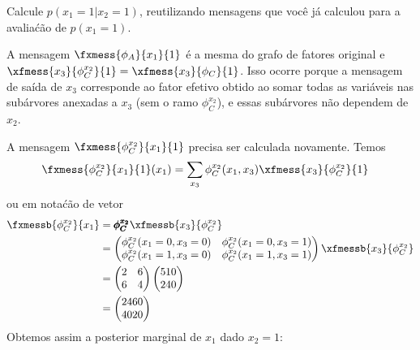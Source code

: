 \begin{exenumerate}
\begin{solution}
    \end{solution}
    
    \item Calcule $p(x_1 =1 | x_2 = 1)$, reutilizando mensagens que voc\^e j\'a calculou para a avalia\'c\~ao de $p(x_1 =1)$.
    
    \begin{solution}
        A mensagem $\fxmess{\phi_A}{x_1}{1}$ \'e a mesma do grafo de fatores
        original e $\xfmess{x_3}{\phi_C^{x_2}}{1} = \xfmess{x_3}{\phi_C}{1}$. Isso
        ocorre porque a mensagem de sa\'ida de $x_3$ corresponde ao fator
        efetivo obtido ao somar todas as vari\'aveis nas sub\'arvores anexadas a
        $x_3$ (sem o ramo $\phi_C^{x_2}$), e essas sub\'arvores n\~ao dependem de $x_2$.
        
        A mensagem $\fxmess{\phi_C^{x_2}}{x_1}{1}$ precisa ser calculada novamente. Temos
        \begin{align}
            \fxmess{\phi_C^{x_2}}{x_1}{1}(x_1) & = \sum_{x_3} \phi_C^{x_2}(x_1,x_3) \xfmess{x_3}{\phi_C^{x_2}}{1}
        \end{align}
        ou em nota\'c\~ao de vetor
        \begin{align}
            \fxmessb{\phi_C^{x_2}}{x_1} & = \pmb{\phi_C^{x_2}} \xfmessb{x_3}{\phi_C^{x_2}}\\
            &= \begin{pmatrix}
                \phi_C^{x_2}(x_1=0,x_3=0) &  \phi_C^{x_2}(x_1=0,x_3=1) \\
                \phi_C^{x_2}(x_1=1,x_3=0) & \phi_C^{x_2}(x_1=1,x_3=1)  
            \end{pmatrix}
            \xfmessb{x_3}{\phi_C^{x_2}}\\
            & = \begin{pmatrix}
                2 & 6 \\
                6 & 4
            \end{pmatrix}
            \begin{pmatrix}
                510\\
                240
            \end{pmatrix}\\
            &=
            \begin{pmatrix}
                2460\\
                4020
            \end{pmatrix}
        \end{align}
        Obtemos assim a posterior marginal de $x_1$ dado $x_2=1$:

\end{solution}
\end{exenumerate}
